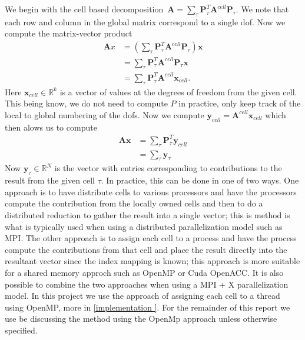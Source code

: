 \documentclass[12pt]{article}
\newcommand{\vect}[1]{\boldsymbol{\mathbf{#1}}}
\begin{document}
We begin with the cell based decomposition~$\mathbf{A} = \sum_{\tau}\vect P^{T}_{\tau}\mathbf{A}^{cell}\vect P_{\tau} $. We note that each row and column in the global matrix correspond to a single dof. Now we compute the matrix-vector product
\begin{align*}
\mathbf{A}x &= \left(\sum_{\tau}\vect P^{T}_{\tau}\mathbf{A}^{cell}\vect P_{\tau} \right)\vect x \\
				&= \sum_{\tau}\vect P^{T}_{\tau}\mathbf{A}^{cell}\vect P_{\tau}\vect x \\
				&= \sum_{\tau}\vect P^{T}_{\tau}\mathbf{A}^{cell}\vect x_{cell}.
\end{align*}
Here $\vect x_{cell} \in \mathbb{R}^{k}$ is a vector of values at the degrees of freedom from the given cell. This being know, we do not need to compute $P$ in practice, only keep track of the local to global numbering of the dofs. Now we compute $\vect y_{cell} = \mathbf{A}^{cell}\vect x_{cell}$ which then alows us to compute
\begin{align*}
\mathbf{A}\vect x &= \sum_{\tau}\vect P^{T}_{\tau}\vect y_{cell} \\
				&= \sum_{\tau} \vect y_{\tau}
\end{align*}
Now $\vect y_{\tau} \in \mathbb{R}^{N}$ is the vector with entries corresponding to contributions to the result from the given cell $\tau$. In practice, this can be done in one of two ways. One approach is to have distribute cells to various processors and have the processors compute the contribution from the locally owned cells and then to do a distributed reduction to gather the result into a single vector; this is method is what is typically used when using a distributed parallelization model such as MPI. The other approach is to assign each cell to a process and have the process compute the contributions from that cell and place the result directly into the resultant vector since the index mapping is known; this approach is more suitable for a shared memory approch such as OpenMP or Cuda OpenACC. It is also possible to combine the two approaches when using a MPI + X parallelization model. In this project we use the approach of assigning each cell to a thread using OpenMP, more in \ref{implementation }. For the remainder of this report we use be discussing the method using the OpenMp approach unless otherwise specified.
\end{document}
